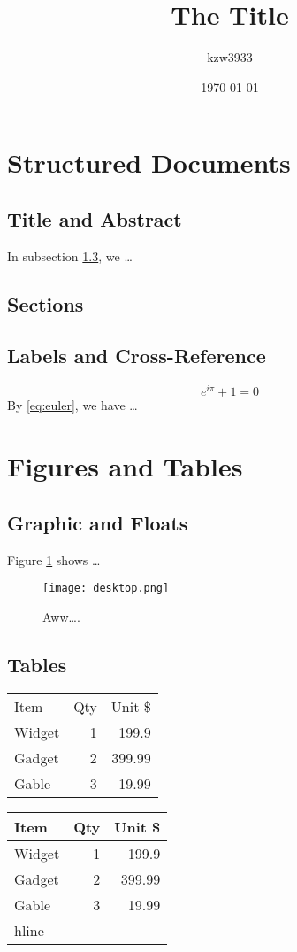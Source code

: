 \documentclass{article}
\title{The Title}
\author{kzw3933}
\date{\today}
\begin{document}
\section{Structured Documents}
\subsection{Title and Abstract}
In subsection \ref{subsec:method}, we \ldots
\subsection{Sections}
\subsection{Labels and Cross-Reference}
\label{subsec:method}

\begin{equation}
    \label{eq:euler}
    e^{i\pi} + 1 = 0
\end{equation}
By \eqref{eq:euler}, we have \ldots

\section{Figures and Tables}
\subsection{Graphic and Floats}

Figure \ref{fig:desktop} shows \ldots

\begin{figure}
\centering
\texttt{[image: desktop.png]}
\caption{\label{fig:desktop}Aww\ldots.}
\end{figure}

\subsection{Tables}
\begin{tabular}{lrr}
    Item & Qty & Unit \$ \\
    Widget & 1 & 199.9 \\
    Gadget & 2 & 399.99 \\
    Gable & 3 & 19.99 \\
\end{tabular}
\begin{tabular}{|l|r|r|}\hline
    Item & Qty & Unit \$ \\\hline
    Widget & 1 & 199.9 \\
    Gadget & 2 & 399.99 \\
    Gable & 3 & 19.99 \\hline
\end{tabular}
\end{document}
